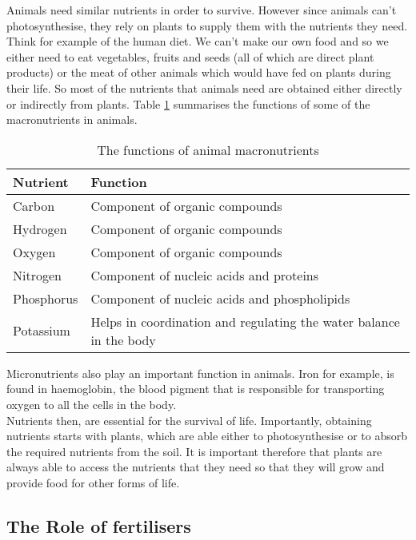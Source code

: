 Animals need similar nutrients in order to survive. However since animals can't photosynthesise, they rely on plants to supply them with the nutrients they need. Think for example of the human diet. We can't make our own food and so we either need to eat vegetables, fruits and seeds (all of which are direct plant products) or the meat of other animals which would have fed on plants during their life. So most of the nutrients that animals need are obtained either directly or indirectly from plants. Table \ref{tab:animal macronutrients} summarises the functions of some of the macronutrients in animals.\\

\begin{table}[h]
\begin{center}
\caption{The functions of animal macronutrients}
\label{tab:animal macronutrients}
\begin{tabular}{|p{3.5cm}|p{5cm}|}\hline
\textbf{Nutrient} & \textbf{Function}\\\hline
Carbon & Component of organic compounds \\\hline
Hydrogen & Component of organic compounds \\\hline
Oxygen & Component of organic compounds \\\hline
Nitrogen & Component of nucleic acids and proteins\\\hline
Phosphorus & Component of nucleic acids and phospholipids \\\hline
Potassium & Helps in coordination and regulating the water balance in the body \\\hline
\end{tabular}
\end{center}
\end{table}

Micronutrients also play an important function in animals. Iron for example, is found in haemoglobin, the blood pigment that is responsible for transporting oxygen to all the cells in the body.\\

Nutrients then, are essential for the survival of life. Importantly, obtaining nutrients starts with plants, which are able either to photosynthesise or to absorb the required nutrients from the soil. It is important therefore that plants are always able to access the nutrients that they need so that they will grow and provide food for other forms of life.

\subsection{The Role of fertilisers}

